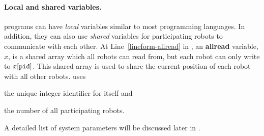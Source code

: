 
%
%
%

\paragraph{Local and shared variables.}
 \lgname programs can have  \emph{local} variables similar to most programming languages.
%
%
In addition, they can also use \emph{shared} variables for participating robots to communicate with each other.
At Line~\ref{lineform-allread} in , an \textbf{allread} variable, $x$, is a shared array which all robots can read from,  but each robot \myuin can only write to $x[\texttt{pid}]$.  This shared array is used to share the current position of each robot with all other robots. 
\LineForm uses
\begin{inparaenum}[(a)]
    \item the unique integer identifier \myuin for itself and
    \item the number \NMAX of all participating robots.
\end{inparaenum}
A detailed list of system parameters will be discussed later in .





